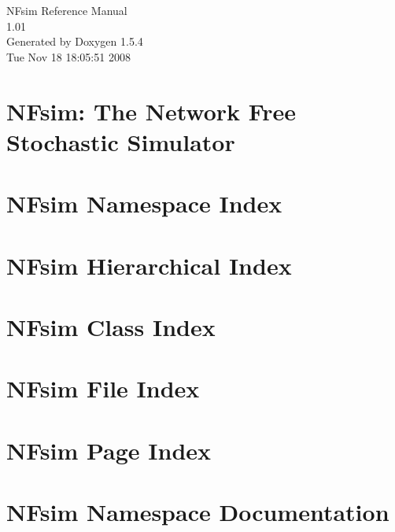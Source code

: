 \documentclass[a4paper]{book}
\begin{document}
\begin{titlepage}
\vspace*{7cm}
\begin{center}
{\Large NFsim Reference Manual\\[1ex]\large 1.01 }\\
\vspace*{1cm}
{\large Generated by Doxygen 1.5.4}\\
\vspace*{0.5cm}
{\small Tue Nov 18 18:05:51 2008}\\
\end{center}
\end{titlepage}
\clearemptydoublepage
{}
\tableofcontents
\clearemptydoublepage
{}
\chapter{NFsim: The Network Free Stochastic Simulator }
\label{index}
\chapter{NFsim Namespace Index}

\chapter{NFsim Hierarchical Index}

\chapter{NFsim Class Index}

\chapter{NFsim File Index}

\chapter{NFsim Page Index}

\chapter{NFsim Namespace Documentation}








\end{document}
